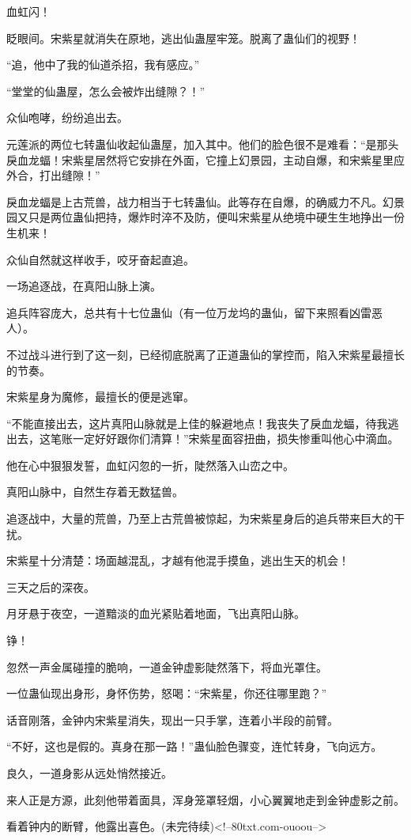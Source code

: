 \begin{this_body}
血虹闪！

眨眼间。宋紫星就消失在原地，逃出仙蛊屋牢笼。脱离了蛊仙们的视野！

“追，他中了我的仙道杀招，我有感应。”

“堂堂的仙蛊屋，怎么会被炸出缝隙？！”

众仙咆哮，纷纷追出去。

元莲派的两位七转蛊仙收起仙蛊屋，加入其中。他们的脸色很不是难看：“是那头戾血龙蝠！宋紫星居然将它安排在外面，它撞上幻景园，主动自爆，和宋紫星里应外合，打出缝隙！”

戾血龙蝠是上古荒兽，战力相当于七转蛊仙。此等存在自爆，的确威力不凡。幻景园又只是两位蛊仙把持，爆炸时淬不及防，便叫宋紫星从绝境中硬生生地挣出一份生机来！

众仙自然就这样收手，咬牙奋起直追。

一场追逐战，在真阳山脉上演。

追兵阵容庞大，总共有十七位蛊仙（有一位万龙坞的蛊仙，留下来照看凶雷恶人）。

不过战斗进行到了这一刻，已经彻底脱离了正道蛊仙的掌控而，陷入宋紫星最擅长的节奏。

宋紫星身为魔修，最擅长的便是逃窜。

“不能直接出去，这片真阳山脉就是上佳的躲避地点！我丧失了戾血龙蝠，待我逃出去，这笔账一定好好跟你们清算！”宋紫星面容扭曲，损失惨重叫他心中滴血。

他在心中狠狠发誓，血虹闪忽的一折，陡然落入山峦之中。

真阳山脉中，自然生存着无数猛兽。

追逐战中，大量的荒兽，乃至上古荒兽被惊起，为宋紫星身后的追兵带来巨大的干扰。

宋紫星十分清楚：场面越混乱，才越有他混手摸鱼，逃出生天的机会！

三天之后的深夜。

月牙悬于夜空，一道黯淡的血光紧贴着地面，飞出真阳山脉。

铮！

忽然一声金属碰撞的脆响，一道金钟虚影陡然落下，将血光罩住。

一位蛊仙现出身形，身怀伤势，怒喝：“宋紫星，你还往哪里跑？”

话音刚落，金钟内宋紫星消失，现出一只手掌，连着小半段的前臂。

“不好，这也是假的。真身在那一路！”蛊仙脸色骤变，连忙转身，飞向远方。

良久，一道身影从远处悄然接近。

来人正是方源，此刻他带着面具，浑身笼罩轻烟，小心翼翼地走到金钟虚影之前。

看着钟内的断臂，他露出喜色。(未完待续)<!--80txt.com-ouoou-->

\end{this_body}

